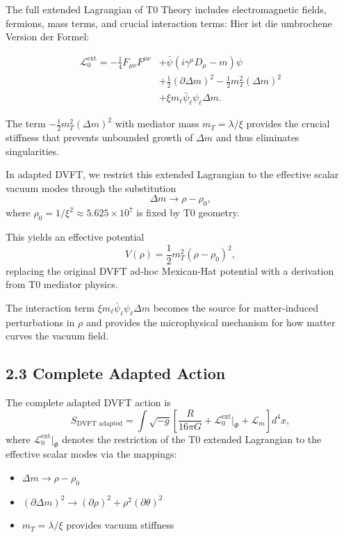 	The full extended Lagrangian of T0 Theory includes electromagnetic fields, fermions, mass terms, and crucial interaction terms:
Hier ist die umbrochene Version der Formel:

\[
\begin{aligned}
	\mathcal{L}_0^{\text{ext}} = -\frac{1}{4} F_{\mu\nu}F^{\mu\nu} &+ \bar{\psi}(i\gamma^\mu D_\mu - m)\psi \\
	&+ \frac{1}{2}(\partial \Delta m)^2 - \frac{1}{2} m_T^2 (\Delta m)^2 \\
	&+ \xi m_\ell \bar{\psi}_\ell \psi_\ell \Delta m.
\end{aligned}
\]
	
	The term $-\frac{1}{2} m_T^2 (\Delta m)^2$ with mediator mass $m_T = \lambda / \xi$ provides the crucial stiffness that prevents unbounded growth of $\Delta m$ and thus eliminates singularities.
	
	In adapted DVFT, we restrict this extended Lagrangian to the effective scalar vacuum modes through the substitution
	\[
	\Delta m \to \rho - \rho_0,
	\]
	where $\rho_0 = 1/\xi^2 \approx 5.625 \times 10^7$ is fixed by T0 geometry.
	
	This yields an effective potential
	\[
	V(\rho) = \frac{1}{2} m_T^2 (\rho - \rho_0)^2,
	\]
	replacing the original DVFT ad-hoc Mexican-Hat potential with a derivation from T0 mediator physics.
	
	The interaction term $\xi m_\ell \bar{\psi}_\ell \psi_\ell \Delta m$ becomes the source for matter-induced perturbations in $\rho$ and provides the microphysical mechanism for how matter curves the vacuum field.
	
	\subsection{2.3 Complete Adapted Action}
	
	The complete adapted DVFT action is
	\[
	S_{\text{DVFT adapted}} = \int \sqrt{-g} \left[ \frac{R}{16\pi G} + \mathcal{L}_0^{\text{ext}} \big|_{\Phi} + \mathcal{L}_m \right] d^4x,
	\]
	where $\mathcal{L}_0^{\text{ext}} \big|_{\Phi}$ denotes the restriction of the T0 extended Lagrangian to the effective scalar modes via the mappings:
	\begin{itemize}
		\item $\Delta m \to \rho - \rho_0$
		\item $(\partial \Delta m)^2 \to (\partial \rho)^2 + \rho^2 (\partial \theta)^2$
		\item $m_T = \lambda / \xi$ provides vacuum stiffness
	\end{itemize}
	
